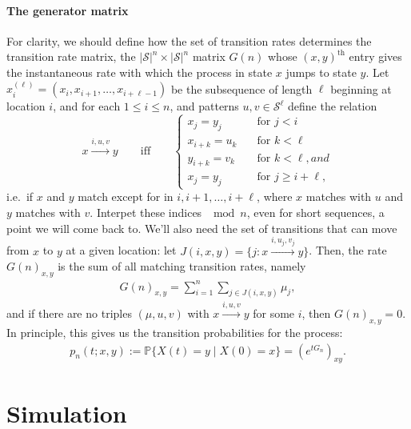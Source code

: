 \documentclass{article}
\renewcommand{\P}{\mathbb{P}}
\newcommand{\calS}{\mathcal{S}}  %
\newcommand{\st}{\colon}  %
\theoremstyle{plain}
\theoremstyle{definition}
\begin{document}
\paragraph{The generator matrix}
For clarity, we should define how the set of transition rates determines the transition rate matrix,
the $|\calS|^n \times |\calS|^n$ matrix $G(n)$ whose $(x,y)^\text{th}$ entry gives the instantaneous rate 
with which the process in state $x$ jumps to state $y$.
Let $x_i^{(\ell)} = (x_i, x_{i+1}, \ldots, x_{i+\ell-1})$ be the subsequence of length $\ell$ beginning at location $i$,
and for each $1\le i \le n$, and patterns $u,v \in \calS^\ell$ define the relation
\[
x \xrightarrow{i,u,v} y \qquad \text{iff} \qquad \begin{cases}
  x_j = y_j \quad &\text{for } j<i \\
  x_{i+k} = u_k \quad &\text{for } k < \ell \\
  y_{i+k} = v_k \quad &\text{for } k < \ell, and \\
  x_j = y_j \quad &\text{for } j\ge i+\ell ,
\end{cases}
\]
i.e.\ if $x$ and $y$ match except for in $i,i+1,\ldots,i+\ell$, where $x$ matches with $u$ and $y$ matches with $v$.
Interpet these indices $\mod n$, even for short sequences, a point we will come back to.
We'll also need the set of transitions that can move from $x$ to $y$ at a given location: let  $J(i,x,y) = \{ j \st x \xrightarrow{i,u_j,v_j} y \}$.
Then, the rate $G(n)_{x,y}$ is the sum of all matching transition rates,
namely
\begin{align} \label{eqn:G_defn}
  G(n)_{x,y} = \sum_{i=1}^n \sum_{j \in J(i,x,y)}  \mu_j ,
\end{align}
and if there are no triples $(\mu,u,v)$ with $x \xrightarrow{i,u,v} y$ for some $i$, then $G(n)_{x,y}=0$.
In principle, this gives us the transition probabilities for the process:
\begin{align} \label{eqn:full_likelihood}
  p_n(t;x,y) := \P\{ X(t) = y \mid X(0) = x \} = (e^{tG_n})_{xy} .
\end{align}


\section{Simulation}
\end{document}
